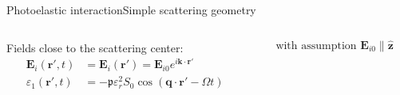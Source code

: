 \documentclass[11pt]{beamer}
\begin{document}
\begin{frame}{Photoelastic interaction}{Simple scattering geometry}
{
		}
		\pause
		\begin{columns}
			\begin{column}{0.6\textwidth}
				Fields close to the scattering center:
				\begin{align*}
					\bm{E}_i (\bm{r}',t) &= \bm{E}_i (\bm{r}') = \bm{E}_{i0} e^{i\bm{k}\cdot\bm{r}'} \\
					\varepsilon_1 (\bm{r}',t) &= -\mathfrak{p} \varepsilon_r^2 S_0 \cos(\bm{q} \cdot \bm{r}' - \Omega t)
				\end{align*}
			\end{column}
			\begin{column}{0.4\textwidth}
				\begin{equation*}
					\text{with assumption } \bm{E}_{i0} \parallel \bm{\hat{z}}
				\end{equation*}
			\end{column}
		\end{columns}
	\end{frame}
	
\end{document}
